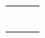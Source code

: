 \documentclass[a4paper]{article}
\begin{document}
	\centering
\begin{tabular}{|C{6cm}|C{6cm}|C{6cm}|}
	\hline
	& & \\[23ex]
	\hline
	& & \\[23ex]
	\hline
	& & \\[23ex]
	\hline
	& & \\[23ex]
	\hline
	& & \\[23ex]
	\hline
	& & \\[23ex]
	\hline
	& & \\[23ex]
	\hline
\end{tabular}
\end{document}
